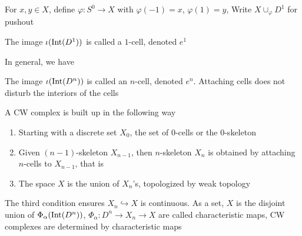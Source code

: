 \documentclass[../main.tex]{subfiles}
\begin{document}
\begin{definition}[CW complexes]
For $x,y\in X$, define $\varphi:S^0\to X$ with $\varphi(-1)=x$, $\varphi(1)=y$, Write $X\cup_\varphi D^1$ for pushout
\begin{center}
\end{center}
The image $\iota(\operatorname{Int}(D^1))$ is called a $1$-cell, denoted $e^1$ \par
In general, we have
\begin{center}
\end{center}
The image $\iota(\operatorname{Int}(D^n))$ is called an $n$-cell, denoted $e^n$. Attaching cells does not disturb the interiors of the cells \par
A CW complex is built up in the following way
\begin{enumerate}
\item Starting with a discrete set $X_0$, the set of $0$-cells or the $0$-skeleton
\item Given $(n-1)$-skeleton $X_{n-1}$, then $n$-skeleton $X_n$ is obtained by attaching $n$-cells to $X_{n-1}$, that is\begin{center}
\end{center}
\item The space $X$ is the union of $X_n$'s, topologized by weak topology
\end{enumerate}
The third condition ensures $X_n\hookrightarrow X$ is continuous. As a set, $X$ is the disjoint union of $\Phi_\alpha(\operatorname{Int}(D^n))$, $\Phi_\alpha:D^n\to X_n\to X$ are called characteristic maps, CW complexes are determined by characteristic maps
\end{definition}
\end{document}
